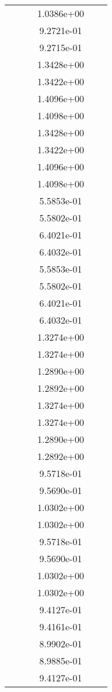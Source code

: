 \begin{xltabular}{\textwidth}{r|rS[table-format=1.3e+2]S[table-format=1.4e+2]S[table-format=1.4e+2]S[table-format=-1.5]}
&  &  & 1.0386e+00 & & \\
&  &  & 9.2721e-01 & & \\
&  &  & 9.2715e-01 & & \\
&  &  & 1.3428e+00 & & \\
&  &  & 1.3422e+00 & & \\
&  &  & 1.4096e+00 & & \\
&  &  & 1.4098e+00 & & \\
&  &  & 1.3428e+00 & & \\
&  &  & 1.3422e+00 & & \\
&  &  & 1.4096e+00 & & \\
&  &  & 1.4098e+00 & & \\
&  &  & 5.5853e-01 & & \\
&  &  & 5.5802e-01 & & \\
&  &  & 6.4021e-01 & & \\
&  &  & 6.4032e-01 & & \\
&  &  & 5.5853e-01 & & \\
&  &  & 5.5802e-01 & & \\
&  &  & 6.4021e-01 & & \\
&  &  & 6.4032e-01 & & \\
&  &  & 1.3274e+00 & & \\
&  &  & 1.3274e+00 & & \\
&  &  & 1.2890e+00 & & \\
&  &  & 1.2892e+00 & & \\
&  &  & 1.3274e+00 & & \\
&  &  & 1.3274e+00 & & \\
&  &  & 1.2890e+00 & & \\
&  &  & 1.2892e+00 & & \\
&  &  & 9.5718e-01 & & \\
&  &  & 9.5690e-01 & & \\
&  &  & 1.0302e+00 & & \\
&  &  & 1.0302e+00 & & \\
&  &  & 9.5718e-01 & & \\
&  &  & 9.5690e-01 & & \\
&  &  & 1.0302e+00 & & \\
&  &  & 1.0302e+00 & & \\
&  &  & 9.4127e-01 & & \\
&  &  & 9.4161e-01 & & \\
&  &  & 8.9902e-01 & & \\
&  &  & 8.9885e-01 & & \\
&  &  & 9.4127e-01 & & \\

\end{xltabular}
